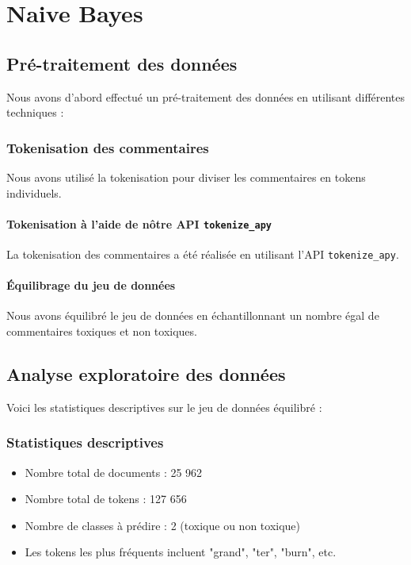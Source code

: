 \chapter{Naive Bayes}

\section{Pré-traitement des données}

Nous avons d'abord effectué un pré-traitement des données en utilisant différentes techniques :

\subsection{Tokenisation des commentaires}

Nous avons utilisé la tokenisation pour diviser les commentaires en tokens individuels.

\subsubsection*{Tokenisation à l'aide de nôtre API \texttt{tokenize\_apy}}

La tokenisation des commentaires a été réalisée en utilisant l'API \texttt{tokenize\_apy}.

\subsubsection*{Équilibrage du jeu de données}

Nous avons équilibré le jeu de données en échantillonnant un nombre égal de commentaires toxiques et non toxiques.

\section{Analyse exploratoire des données}

Voici les statistiques descriptives sur le jeu de données équilibré :

\subsection{Statistiques descriptives}

\begin{itemize}
    \item Nombre total de documents : 25 962
    \item Nombre total de tokens : 127 656
    \item Nombre de classes à prédire : 2 (toxique ou non toxique)
    \item Les tokens les plus fréquents incluent "grand", "ter", "burn", etc.
\end{itemize}

